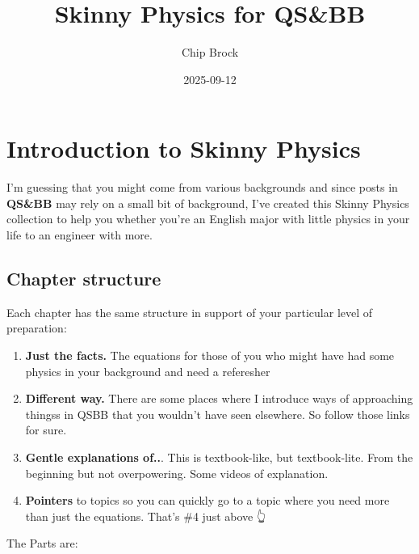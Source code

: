 \documentclass[
  letterpaper,
  DIV=11,
  numbers=noendperiod,
  oneside]{scrreprt}
\title{Skinny Physics for QS\&BB}
\author{Chip Brock}
\date{2025-09-12}
\providecommand{\tightlist}{%
  \setlength{\itemsep}{0pt}\setlength{\parskip}{0pt}}\usepackage{longtable,booktabs,array}
\renewcommand*\contentsname{Table of contents}
\newcommand\contentsname{Table of contents}
\begin{document}
\maketitle

\renewcommand*\contentsname{Table of contents}
{
\hypersetup{linkcolor=}
\setcounter{tocdepth}{2}
\tableofcontents
}


\chapter{Introduction to Skinny
Physics}\label{introduction-to-skinny-physics}

I'm guessing that you might come from various backgrounds and since
posts in \textbf{QS\&BB} may rely on a small bit of background, I've
created this Skinny Physics collection to help you whether you're an
English major with little physics in your life to an engineer with more.

\section{Chapter structure}\label{chapter-structure}

Each chapter has the same structure in support of your particular level
of preparation:

\begin{enumerate}
\def\labelenumi{\arabic{enumi}.}
\tightlist
\item
  \textbf{Just the facts.} The equations for those of you who might have
  had some physics in your background and need a referesher
\item
  \textbf{Different way.} There are some places where I introduce ways
  of approaching thingss in QSBB that you wouldn't have seen elsewhere.
  So follow those links for sure.
\item
  \textbf{Gentle explanations of..}. This is textbook-like, but
  textbook-lite. From the beginning but not overpowering. Some videos of
  explanation.
\item
  \textbf{Pointers} to topics so you can quickly go to a topic where you
  need more than just the equations. That's \#4 just above 👆
\end{enumerate}

The Parts are:
\end{document}
